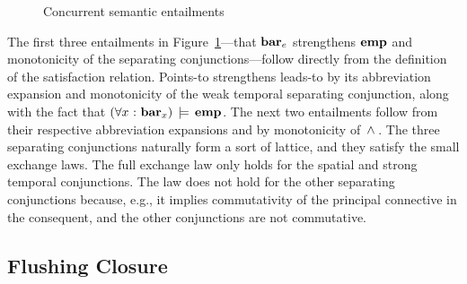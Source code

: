 \documentclass[11pt]{report}         %
\begin{document}
\begin{figure}[ht]
      \centering
      \caption{\label{fig:entailments}Concurrent semantic entailments}
\end{figure}

The first three entailments in Figure~\ref{fig:entailments}---that $\mathbf{bar}_{e}$ strengthens $\mathbf{emp}$ and monotonicity of the separating conjunctions---follow directly from the definition of the satisfaction relation. Points-to strengthens leads-to by its abbreviation expansion and monotonicity of the weak temporal separating conjunction, along with the fact that $(\forall x \operatorname{\,:\,} \mathbf{bar}_{x}) \,\models\, \mathbf{emp}$. The next two entailments follow from their respective abbreviation expansions and by monotonicity of $\operatorname{\,\wedge\,}$. The three separating conjunctions naturally form a sort of lattice, and they satisfy the small exchange laws. The full exchange law only holds for the spatial and strong temporal conjunctions. The law does not hold for the other separating conjunctions because, e.g., it implies commutativity of the principal connective in the consequent, and the other conjunctions are not commutative. 

\subsection{Flushing Closure}
\label{sec:predicates}
\end{document}
